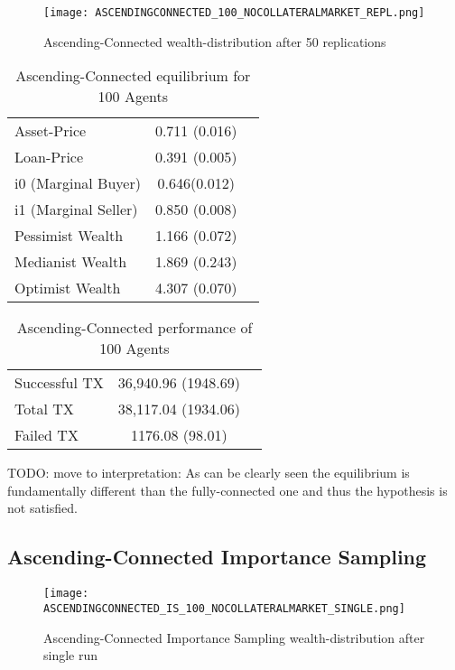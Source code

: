 \documentclass[Bachelorarbeit.tex]{subfiles}
\begin{document}
\begin{figure}[!htbp]
	\centering
  \texttt{[image: ASCENDINGCONNECTED\_100\_NOCOLLATERALMARKET\_REPL.png]}
	\caption{Ascending-Connected wealth-distribution after 50 replications}
	\label{fig1}
\end{figure}

\begin{table}[h]
	\caption{Ascending-Connected equilibrium for 100 Agents}
	\centering
	\begin{tabular} { l c r }
		\hline
		Asset-Price & 0.711 (0.016) \\
		Loan-Price & 0.391 (0.005) \\
		i0 (Marginal Buyer) & 0.646(0.012) \\
		i1 (Marginal Seller) & 0.850 (0.008) \\
		Pessimist Wealth & 1.166 (0.072) \\
		Medianist Wealth & 1.869 (0.243) \\
		Optimist Wealth & 4.307 (0.070) \\
		\hline
	\end{tabular}
\end{table} 

\begin{table}[h]
	\caption{Ascending-Connected performance of 100 Agents}
	\centering
	\begin{tabular} { l c r }
		\hline
		Successful TX & 36,940.96 (1948.69) \\
		Total TX & 38,117.04 (1934.06) \\
		Failed TX & 1176.08 (98.01) \\
		\hline
	\end{tabular}
\end{table}

TODO: move to interpretation: As can be clearly seen the equilibrium is fundamentally different than the fully-connected one and thus the hypothesis is not satisfied.

\subsection{Ascending-Connected Importance Sampling}
\begin{figure}[!htbp]
	\centering
  \texttt{[image: ASCENDINGCONNECTED\_IS\_100\_NOCOLLATERALMARKET\_SINGLE.png]}
	\caption{Ascending-Connected Importance Sampling wealth-distribution after single run}
	\label{fig1}
\end{figure}
\end{document}
